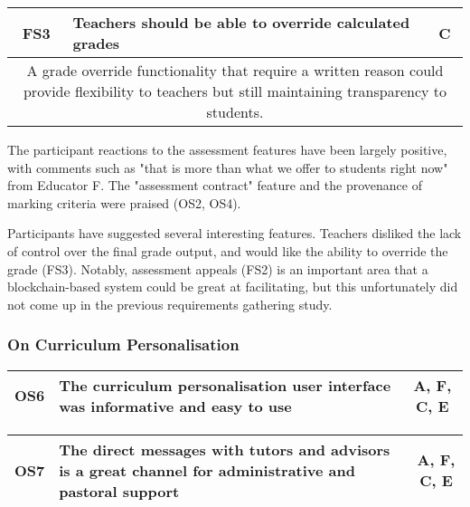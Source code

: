 \begin{table}[!ht]
	\begin{tabularx}{\textwidth}{|c|X|c|}
		\hline
		FS3 & \textbf{Teachers should be able to override calculated grades} & C \\
		\hline
		\multicolumn{3}{|X|}{
			A grade override functionality that require a written reason could provide
			flexibility to teachers but still maintaining transparency to students.
		}                                                                        \\
		\hline
	\end{tabularx}
\end{table}

The participant reactions to the assessment features have been largely positive, 
with comments such as "that is more than what we offer to students right now" from 
Educator F.
The "assessment contract" feature and the provenance of marking criteria were praised (OS2, OS4).

Participants have suggested several interesting features.
Teachers disliked the lack of control over the final grade output, and would like 
the ability to override the grade (FS3).
Notably, assessment appeals (FS2) is an important area that a blockchain-based system 
could be great at facilitating, but this unfortunately did not come up in the previous 
requirements gathering study.

\subsubsection{On Curriculum Personalisation}

\begin{table}[!ht]
	\begin{tabularx}{\textwidth}{|c|X|c|}
		\hline
		OS6 & \textbf{The curriculum personalisation user interface was informative and easy to use} & A, F, C, E \\
		\hline
	\end{tabularx}
\end{table}

\begin{table}[!ht]
	\begin{tabularx}{\textwidth}{|c|X|c|}
		\hline
		OS7 & \textbf{The direct messages with tutors and advisors is a great channel for administrative and pastoral support} & A, F, C, E \\
		\hline
	\end{tabularx}
\end{table}

